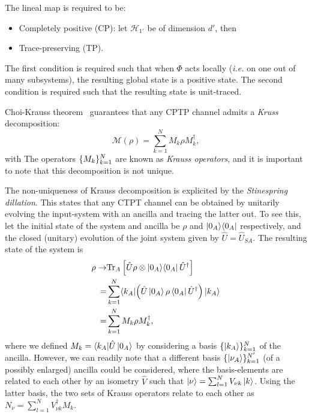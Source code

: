 The lineal map is required to be:
\begin{itemize}\item Completely positive (CP): let $\mathcal{H}_{1'}$ be of dimension $d'$, then 
\item Trace-preserving (TP).
\end{itemize}The first condition is required such that when $\Phi$ acts locally (\textit{i.e.} on one out of many subsystems), the resulting global state is a positive state. The second condition is required such that the resulting state is unit-traced.

Choi-Krauss theorem~\cite{manzano2019} guarantees that any CPTP channel admits a \textit{Kruss} decomposition:
\begin{equation}
\mathcal{M}(\rho) = \sum_{k=1}^N M_k \rho M_k^\dagger,
\end{equation}
with
The operators $\lbrace M_k\rbrace_{k=1}^N$ are known as \textit{Krauss operators}, and it is important to note that this decomposition is not unique.

The non-uniqueness of Krauss decomposition is explicited by the \textit{Stinespring dillation}. This states that any CTPT channel can be obtained by unitarily evolving the input-system with an ancilla and tracing the latter out. To see this, let the initial state of the system and ancilla be $\rho$ and $\proj{0_A}$ respectively, and the closed (unitary) evolution of the joint system given by $\hat{U} = \hat{U}_{SA}$. The resulting state of the system is
\begin{align}\label{eq:stinesrping}
\rho \rightarrow& \text{Tr}_A\left[\hat{U} \rho \otimes \proj{0_A} \hat{U}^\dagger\right] \\
=& \sum_{k=1}^N \langle k_A| \Big( \hat{U} \ket{0_A} \rho \bra{0_A} \hat{U}^\dagger \Big) \ket{k_A}\\
=& \sum_{k=1}^N M_k \rho M_k^\dagger,
\end{align}
where we defined $M_k = \langle k_A|\hat{U} \ket{0_A}$ by considering a basis $\llaves{\ket{k_A}}_{k=1}^N$ of the ancilla. However, we can readily note that a different basis $\llaves{\ket{\nu_A}}_{k=1}^{N'}$ (of a possibly enlarged) ancilla could be considered, where the basis-elements are related to each other by an isometry $\hat{V}$ such that $\ket{\nu} = \sum_{l=1}^{N} V_{\nu k}\ket{k}$. Using the latter basis, the two sets of Krauss operators relate to each other as $N_\nu = \sum_{l=1}^{N} V^\dagger_{\nu k} M_k$.

